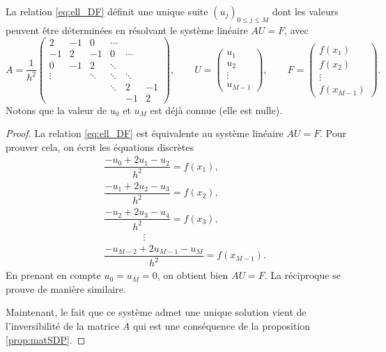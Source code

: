 \documentclass[12pt,a4paper,twoside]{article}
\begin{document}
\begin{proposition}
  La relation \eqref{eq:ell_DF} d\'efinit une unique suite $(u_j)_{0\leq j \leq M}$ dont les valeurs
  peuvent \^etre d\'etermin\'ees en r\'esolvant le syst\`eme lin\'eaire
  $A U = F$, avec 
  \begin{equation}
    \label{eq:mat_DF_Laplacien}
    A = \dfrac{1}{h^2} 
    \begin{pmatrix} 
      2 & -1 & 0 & \cdots
      \\
      -1 & 2 & -1 & 0 & \cdots
      \\
      0 & -1 & 2 & \ddots &
      \\
      \vdots & & \ddots & \ddots & \ddots
      \\
      & & &  \ddots & 2 & -1
      \\
      & &  & & -1 & 2
    \end{pmatrix} , \qquad U = 
    \begin{pmatrix}
      u_1 \\ u_2 \\ \vdots \\ u_{M-1}
    \end{pmatrix} , \qquad F = 
    \begin{pmatrix}
      f(x_1) \\ f(x_2) \\ \vdots \\ f(x_{M-1})
    \end{pmatrix} .
  \end{equation}
  Notons que la valeur de $u_0$ et $u_M$ est d\'ej\`a connue (elle est nulle).
\end{proposition}

\begin{proof}
  La relation \eqref{eq:ell_DF} est \'equivalente au syst\`eme lin\'eaire $AU = F$.
  Pour prouver cela, on \'ecrit les \'equations discr\`etes
  \begin{align*}
    &\dfrac{-u_0 + 2 u_1 - u_2}{h^2} = f(x_1) ,
    \\
    &\dfrac{-u_1 + 2 u_2 - u_3}{h^2} = f(x_2) ,
    \\
    &\dfrac{-u_2 + 2 u_3 - u_4}{h^2} = f(x_3) ,
    \\
    & \qquad \qquad \vdots
    \\
    &\dfrac{-u_{M-2} + 2 u_{M-1} - u_M}{h^2} = f(x_{M-1}) .
  \end{align*}
  En prenant en compte $u_0 = u_M = 0$, on obtient bien $AU = F$.
  La r\'eciproque se prouve de mani\`ere similaire.

  Maintenant, le fait que ce syst\`eme admet une unique solution vient de l'inversibilit\'e
  de la matrice $A$ qui est une cons\'equence de la proposition \ref{prop:matSDP}.
\end{proof}
\end{document}
